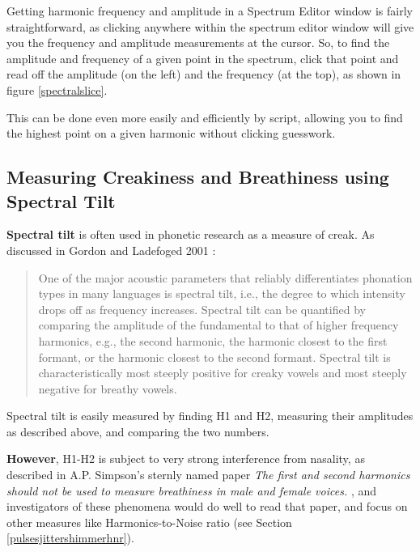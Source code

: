\documentclass[11pt]{article}
\begin{document}
Getting harmonic frequency and amplitude in a Spectrum Editor window is
fairly straightforward, as clicking anywhere within the spectrum editor
window will give you the frequency and amplitude measurements at the
cursor. So, to find the amplitude and frequency of a given point in the
spectrum, click that point and read off the amplitude (on the left) and
the frequency (at the top), as shown in figure \ref{spectralslice}.

This can be done even more easily and efficiently by script, allowing
you to find the highest point on a given harmonic without clicking
guesswork.

\hypertarget{measuring-creakiness-and-breathiness-using-spectral-tilt}{%
\subsection{Measuring Creakiness and Breathiness using Spectral
Tilt}\label{measuring-creakiness-and-breathiness-using-spectral-tilt}}

\label{creakybreathy}

\textbf{Spectral tilt} is often used in phonetic research as a measure
of creak. As discussed in Gordon and Ladefoged 2001
\cite{Gordon:2001um}:

\begin{quote}
One of the major acoustic parameters that reliably differentiates
phonation types in many languages is spectral tilt, i.e., the degree to
which intensity drops off as frequency increases. Spectral tilt can be
quantified by comparing the amplitude of the fundamental to that of
higher frequency harmonics, e.g., the second harmonic, the harmonic
closest to the first formant, or the harmonic closest to the second
formant. Spectral tilt is characteristically most steeply positive for
creaky vowels and most steeply negative for breathy vowels.
\end{quote}

Spectral tilt is easily measured by finding H1 and H2, measuring their
amplitudes as described above, and comparing the two numbers.

\textbf{However}, H1-H2 is subject to very strong interference from
nasality, as described in A.P. Simpson's sternly named paper \emph{The
first and second harmonics should not be used to measure breathiness in
male and female voices.} \cite{simpson2012first}, and investigators of
these phenomena would do well to read that paper, and focus on other
measures like Harmonics-to-Noise ratio (see Section
\ref{pulsesjittershimmerhnr}).
\end{document}

